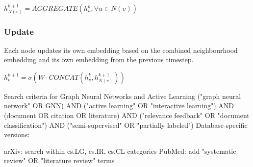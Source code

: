 \documentclass[../main.tex]{subfiles}
\begin{document}
    $h_{N(v)}^{k+1} = AGGREGATE({h_u^k, \forall u \in N(v)})$

    \subsubsection{Update}

    Each node updates its own embedding based on the combined neighbourhood embedding and its own embedding from the previous timestep. 

    $h_v^{k+1} = \sigma(W \cdot CONCAT(h_v^k, h_{N(v)}^{k+1}))$


    Search criteria for Graph Neural Networks and Active Learning
    ("graph neural network" OR GNN) AND ("active learning" OR "interactive learning") AND (document OR citation OR literature) AND ("relevance feedback" OR "document classification") AND ("semi-supervised" OR "partially labeled")
    Database-specific versions:

    arXiv: search within cs.LG, cs.IR, cs.CL categories
    PubMed: add "systematic review" OR "literature review" terms

    
\end{document}
